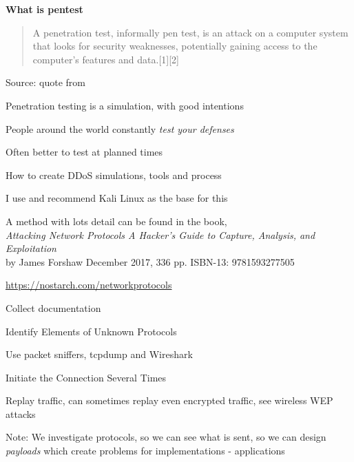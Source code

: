 \documentclass[Screen16to9,17pt]{foils}
\begin{document}

{\bf What is pentest}

\begin{quote}
A penetration test, informally pen test, is an attack on a computer system that looks for security weaknesses, potentially gaining access to the computer's features and data.[1][2]
\end{quote}
Source: quote from 

\begin{list1}
\item Penetration testing is a simulation, with good intentions
\item People around the world constantly \emph{test your defenses}
\item Often better to test at planned times
\item How to create DDoS simulations, tools and process
\item I use and recommend Kali Linux as the base for this
\end{list1}





A method with lots detail can be found in the book,\\
\emph{Attacking Network Protocols A Hacker's Guide to Capture, Analysis, and Exploitation}\\
by James Forshaw December 2017, 336 pp. ISBN-13: 9781593277505

\url{https://nostarch.com/networkprotocols}



\begin{list2}
\item Collect documentation
\item Identify Elements of Unknown Protocols
\item Use packet sniffers, tcpdump and Wireshark
\item Initiate the Connection Several Times
\item Replay traffic, can sometimes replay even encrypted traffic, see wireless WEP attacks
\end{list2}

Note: We investigate protocols, so we can see what is sent, so we can design \emph{payloads} which create problems for implementations - applications
\end{document}
